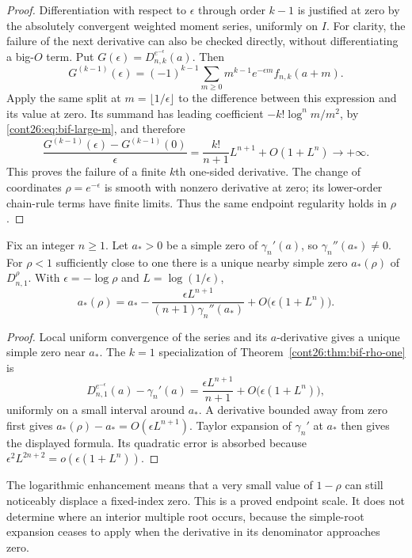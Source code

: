 \begin{proof}
Differentiation with respect to $\epsilon$ through order $k-1$ is
justified at zero by the absolutely convergent weighted moment series,
uniformly on $I$. For clarity, the failure of the next derivative can
also be checked directly, without differentiating a big-$O$ term.
Put $G(\epsilon)=D_{n,k}^{e^{-\epsilon}}(a)$. Then
\[
 G^{(k-1)}(\epsilon)
   =(-1)^{k-1}\sum_{m\geq0}m^{k-1}e^{-\epsilon m}f_{n,k}(a+m).
\]
Apply the same split at $m=\lfloor1/\epsilon\rfloor$ to the difference
between this expression and its value at zero. Its summand has leading
coefficient $-k!\log^n m/m^2$, by \eqref{cont26:eq:bif-large-m}, and therefore
\[
 \frac{G^{(k-1)}(\epsilon)-G^{(k-1)}(0)}{\epsilon}
   =\frac{k!}{n+1}L^{n+1}+O(1+L^n)\longrightarrow+\infty.
\]
This proves the failure of a finite $k$th one-sided derivative. The
change of coordinates $\rho=e^{-\epsilon}$ is smooth with nonzero
derivative at zero; its lower-order chain-rule terms have finite limits.
Thus the same endpoint regularity holds in $\rho$.
\end{proof}

\begin{corollary}
\label{cont26:cor:bif-stieltjes-displacement}
Fix an integer $n\geq1$. Let $a_*>0$ be a simple zero of $\gamma_n'(a)$, so
$\gamma_n''(a_*)\ne0$. For $\rho<1$ sufficiently close to one there is a
unique nearby simple zero $a_*(\rho)$ of $D_{n,1}^{\rho}$. With
$\epsilon=-\log\rho$ and $L=\log(1/\epsilon)$,
\begin{equation}\label{cont26:eq:bif-root-displacement}
 a_*(\rho)=a_*
   -\frac{\epsilon L^{n+1}}{(n+1)\gamma_n''(a_*)}
   +O\bigl(\epsilon(1+L^n)\bigr).
\end{equation}
\end{corollary}
\begin{proof}
Local uniform convergence of the series and its $a$-derivative gives
a unique simple zero near $a_*$. The $k=1$ specialization of
Theorem~\ref{cont26:thm:bif-rho-one} is
\[
 D_{n,1}^{e^{-\epsilon}}(a)-\gamma_n'(a)
     =\frac{\epsilon L^{n+1}}{n+1}
           +O\bigl(\epsilon(1+L^n)\bigr),
\]
uniformly on a small interval around $a_*$. A derivative bounded away
from zero first gives $a_*(\rho)-a_*=O(\epsilon L^{n+1})$.
Taylor expansion of $\gamma_n'$ at $a_*$ then gives the displayed
formula. Its quadratic error is absorbed because
$\epsilon^2L^{2n+2}=o(\epsilon(1+L^n))$.
\end{proof}

The logarithmic enhancement means that a very small value of $1-\rho$
can still noticeably displace a fixed-index zero. This is a proved
endpoint scale. It does not determine where an interior multiple root
occurs, because the simple-root expansion ceases to apply when the
derivative in its denominator approaches zero.

